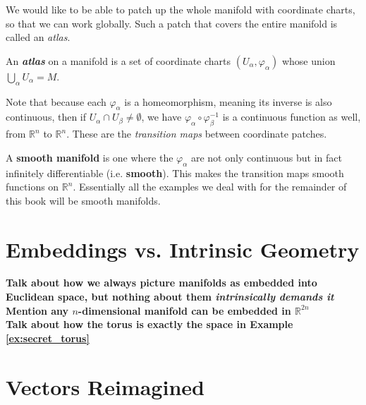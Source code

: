 	We would like to be able to patch up the whole manifold with coordinate charts, so that we can work globally. Such a patch that covers the entire manifold is called an \emph{atlas}.
	
	\begin{defn}[Atlas]\label{def:Atlas}
		An \textbf{\emph{atlas}} on a manifold is a set of coordinate charts $(U_\alpha, \varphi_\alpha)$ whose union $\bigcup_\alpha U_\alpha = M$.
	\end{defn}
	
	Note that because each $\varphi_\alpha$ is a homeomorphism, meaning its inverse is also continuous, then if $U_\alpha \cap U_\beta \neq \emptyset$, we have $\varphi_\alpha \circ \varphi_\beta^{-1}$ is a continuous function as well, from $\mathbb{R}^n$ to $\mathbb{R}^n$. These are the \emph{transition maps} between coordinate patches.
	
	A \textbf{smooth manifold} is one where the $\varphi_\alpha$ are not only continuous but in fact infinitely differentiable (i.e. \textbf{smooth}). This makes the transition maps smooth functions on $\mathbb{R}^n$. Essentially all the examples we deal with for the remainder of this book will be smooth manifolds.
	
	
	\section{Embeddings vs. Intrinsic Geometry} %
	\label{sec:embeddings_vs._intrinsic_geometry}
	
	\textbf{Talk about how we always picture manifolds as embedded into Euclidean space, but nothing about them \emph{intrinsically demands it}}\\ 
	
	\textbf{Mention any $n$-dimensional manifold can be embedded in $\mathbb{R}^{2n}$}\\

	
	\textbf{Talk about how the torus is exactly the space in Example \ref{ex:secret_torus}}
	
	
	\section{Vectors Reimagined} %
	\label{sec:vectors_reimagined}
	
